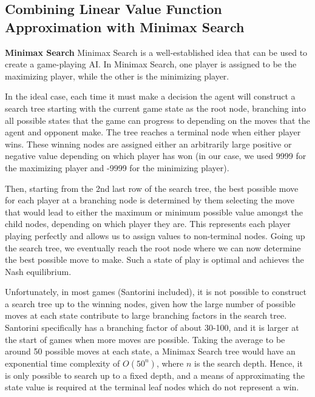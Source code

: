 \documentclass[a4paper,12pt,table]{article}
\begin{document}
\subsection{Combining Linear Value Function Approximation with Minimax Search}

\textbf{Minimax Search}
\newline
Minimax Search is a well-established idea that can be used to create a game-playing AI. In Minimax Search, one player is assigned to be the maximizing player, while the other is the minimizing player. \par

In the ideal case, each time it must make a decision the agent will construct a search tree starting with the current game state as the root node, branching into all possible states that the game can progress to depending on the moves that the agent and opponent make. The tree reaches a terminal node when either player wins. These winning nodes are assigned either an arbitrarily large positive or negative value depending on which player has won (in our case, we used 9999 for the maximizing player and -9999 for the minimizing player). \par

Then, starting from the 2nd last row of the search tree, the best possible move for each player at a branching node is determined by them selecting the move that would lead to either the maximum or minimum possible value amongst the child nodes, depending on which player they are. This represents each player playing perfectly and allows us to assign values to non-terminal nodes. Going up the search tree, we eventually reach the root node where we can now determine the best possible move to make. Such a state of play is optimal and achieves the Nash equilibrium. \par

Unfortunately, in most games (Santorini included), it is not possible to construct a search tree up to the winning nodes, given how the large number of possible moves at each state contribute to large branching factors in the search tree. Santorini specifically has a branching factor of about 30-100, and it is larger at the start of games when more moves are possible. Taking the average to be around 50 possible moves at each state, a Minimax Search tree would have an exponential time complexity of $O(50^n)$, where $n$ is the search depth. Hence, it is only possible to search up to a fixed depth, and a means of approximating the state value is required at the terminal leaf nodes which do not represent a win. \par
\end{document}
